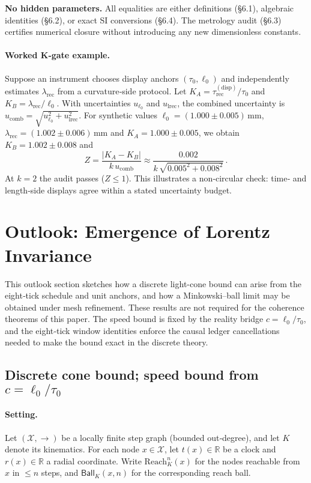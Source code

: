 \documentclass[12pt,a4paper]{article}
\theoremstyle{definition}
\theoremstyle{remark}
\begin{document}
\bigskip

\noindent
\textbf{No hidden parameters.} All equalities are either definitions (\S6.1), algebraic identities (\S6.2), or exact SI conversions (\S6.4). The metrology audit (\S6.3) certifies numerical closure without introducing any new dimensionless constants.

\paragraph{Worked K‑gate example.}
Suppose an instrument chooses display anchors \((\tau_0,\ell_0)\) and independently estimates \(\lambda_{\mathrm{rec}}\) from a curvature‑side protocol. Let $K_A=\tau_{\mathrm{rec}}^{(\mathrm{disp})}/\tau_0$ and $K_B=\lambda_{\mathrm{rec}}/\ell_0$. With uncertainties $u_{\ell_0}$ and $u_{\mathrm{lrec}}$, the combined uncertainty is $u_{\mathrm{comb}}=\sqrt{u_{\ell_0}^2+u_{\mathrm{lrec}}^2}$. For synthetic values \(\ell_0=(1.000\pm0.005)\,\mathrm{mm}\), \(\lambda_{\mathrm{rec}}=(1.002\pm0.006)\,\mathrm{mm}\) and \(K_A=1.000\pm0.005\), we obtain $K_B=1.002\pm0.008$ and
\[
 Z=\frac{|K_A-K_B|}{k\,u_{\mathrm{comb}}}\approx \frac{0.002}{k\,\sqrt{0.005^2+0.008^2}}\,.
\]
At $k=2$ the audit passes ($Z\le 1$). This illustrates a non‑circular check: time‑ and length‑side displays agree within a stated uncertainty budget.

\section{Outlook: Emergence of Lorentz Invariance}
This outlook section sketches how a discrete light-cone bound can arise from the eight‑tick schedule and unit anchors, and how a Minkowski–ball limit may be obtained under mesh refinement. These results are not required for the coherence theorems of this paper. The speed bound is fixed by the reality bridge \(c=\ell_0/\tau_0\), and the eight‑tick window identities enforce the causal ledger cancellations needed to make the bound exact in the discrete theory.

\subsection{Discrete cone bound; speed bound from \(c=\ell_0/\tau_0\)}
\paragraph{Setting.}
Let \((\mathcal{X},\to)\) be a locally finite step graph (bounded out‑degree), and let \(K\) denote its kinematics. For each node \(x\in\mathcal{X}\), let \(t(x)\in\mathbb{R}\) be a clock and \(r(x)\in\mathbb{R}\) a radial coordinate. Write \(\mathrm{Reach}_K^n(x)\) for the nodes reachable from \(x\) in \(\le n\) steps, and \(\mathsf{Ball}_K(x,n)\) for the corresponding reach ball.
\end{document}
